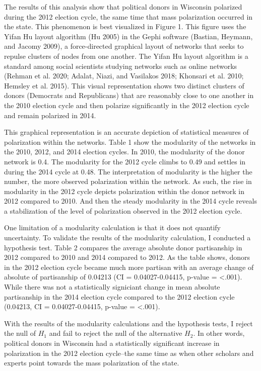 \documentclass[12pt,]{article}
\begin{document}
The results of this analysis show that political donors in Wisconsin
polarized during the 2012 election cycle, the same time that mass
polarization occurred in the state. This phenomenon is best visualized
in Figure 1. This figure uses the Yifan Hu layout algorithm (Hu 2005) in
the Gephi software (Bastian, Heymann, and Jacomy 2009), a force-directed
graphical layout of networks that seeks to repulse clusters of nodes
from one another. The Yifan Hu layout algorithm is a standard among
social scientists studying networks such as online networks (Rehman et
al. 2020; Adalat, Niazi, and Vasilakos 2018; Khonsari et al. 2010;
Hemsley et al. 2015). This visual representation shows two distinct
clusters of donors (Democrats and Republicans) that are reasonably close
to one another in the 2010 election cycle and then polarize
significantly in the 2012 election cycle and remain polarized in 2014.

This graphical representation is an accurate depiction of statistical
measures of polarization within the networks. Table 1 show the
modularity of the networks in the 2010, 2012, and 2014 election cycles.
In 2010, the modularity of the donor network is 0.4. The modularity for
the 2012 cycle climbs to 0.49 and settles in during the 2014 cycle at
0.48. The interpretation of modularity is the higher the number, the
more observed polarization within the network. As such, the rise in
modularity in the 2012 cycle depicts polarization within the donor
network in 2012 compared to 2010. And then the steady modularity in the
2014 cycle reveals a stabilization of the level of polarization observed
in the 2012 election cycle.

One limitation of a modularity calculation is that it does not quantify
uncertainty. To validate the results of the modularity calculation, I
conducted a hypothesis test. Table 2 compares the average absolute donor
partisanship in 2012 compared to 2010 and 2014 compared to 2012. As the
table shows, donors in the 2012 election cycle became much more partisan
with an average change of absolute of partisanship of 0.04213 (CI =
0.04027-0.04415, p-value = \textless.001). While there was not a
statistically signiciant change in mean absolute partisanship in the
2014 election cycle compared to the 2012 election cycle (0.04213, CI =
0.04027-0.04415, p-value = \textless.001).

With the results of the modularity calculations and the hypothesis
tests, I reject the null of \(H_{1}\) and fail to reject the null of the
alternative \(H_{2}\). In other words, political donors in Wisconsin had
a statistically significant increase in polarization in the 2012
election cycle--the same time as when other scholars and experts point
towards the mass polarization of the state.
\end{document}
